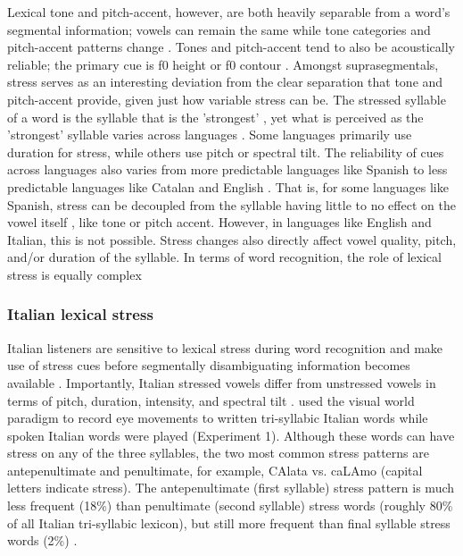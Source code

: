 Lexical tone and pitch-accent, however, are both heavily separable from a word's segmental information; vowels can remain the same while tone categories and pitch-accent patterns change \citep{Zeng2017}. Tones and pitch-accent tend to also be acoustically reliable; the primary cue is f0 height or f0 contour \citep{goss_2014}. Amongst suprasegmentals, stress serves as an interesting deviation from the clear separation that tone and pitch-accent provide, given just how variable stress can be. The stressed syllable of a word is the syllable that is the 'strongest' \citep{sluijter1996spectral}, yet what is perceived as the 'strongest' syllable varies across languages \citep{Cutler1988}. Some languages primarily use duration for stress, while others use pitch or spectral tilt. The reliability of cues across languages also varies from more predictable languages like Spanish to less predictable languages like Catalan and English \citep{ortega_2011, beckman_1994}. That is, for some languages like Spanish, stress can be decoupled from the syllable having little to no effect on the vowel itself \citep{ortega_2011}, like tone or pitch accent. However, in languages like English and Italian, this is not possible. Stress changes also directly affect vowel quality, pitch, and/or duration of the syllable. In terms of word recognition, the role of lexical stress is equally complex \citep{cutler2001voornaam, Reinisch2010}

\subsubsection{Italian lexical stress}
Italian listeners are sensitive to lexical stress during word recognition and make use of stress cues before segmentally disambiguating information becomes available \citep{Tagliapietra2005, Sulpizio_McQueen_2012}. Importantly, Italian stressed vowels differ from unstressed vowels in terms of pitch, duration, intensity, and spectral tilt \citep{Maturi1998}. \cite{Sulpizio_McQueen_2012} used the visual world paradigm to record eye movements to written tri-syllabic Italian words while spoken Italian words were played (Experiment 1). Although these words can have stress on any of the three syllables, the two most common stress patterns are antepenultimate and penultimate, for example, CAlata vs. caLAmo (capital letters indicate stress). The antepenultimate (first syllable) stress pattern is much less frequent (18\%) than penultimate (second syllable) stress words (roughly 80\% of all Italian tri-syllabic lexicon), but still more frequent than final syllable stress words (2\%) \citep{thornton_1997}. 

